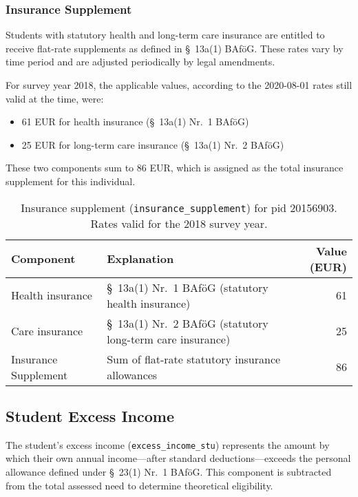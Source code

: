 \subsubsection{Insurance Supplement}
Students with statutory health and long-term care insurance are entitled to receive flat-rate supplements as defined in §~13a(1) BAföG. These rates vary by time period and are adjusted periodically by legal amendments.

For survey year 2018, the applicable values, according to the 2020-08-01 rates still valid at the time, were:
\begin{itemize}
    \item 61 EUR for health insurance (§~13a(1) Nr.~1 BAföG)
    \item 25 EUR for long-term care insurance (§~13a(1) Nr.~2 BAföG)
\end{itemize}

These two components sum to 86 EUR, which is assigned as the total insurance supplement for this individual.

\begin{table}[H]
\scriptsize
\centering
\begin{tabular}{llr}
\toprule
\textbf{Component} & \textbf{Explanation} & \textbf{Value (EUR)} \\
\midrule
\quad Health insurance & §~13a(1) Nr.~1 BAföG (statutory health insurance) & 61 \\
\quad Care insurance & §~13a(1) Nr.~2 BAföG (statutory long-term care insurance) & 25 \\
\midrule
Insurance Supplement & Sum of flat-rate statutory insurance allowances & 86 \\
\bottomrule
\end{tabular}
\caption{Insurance supplement (\texttt{insurance\_supplement}) for pid 20156903. Rates valid for the 2018 survey year.}
\label{table:bafoeg_insurance}
\end{table}


\subsection{Student Excess Income}
The student’s excess income (\texttt{excess\_income\_stu}) represents the amount by which their own annual income—after standard deductions—exceeds the personal allowance defined under §~23(1) Nr.~1 BAföG. This component is subtracted from the total assessed need to determine theoretical eligibility.

